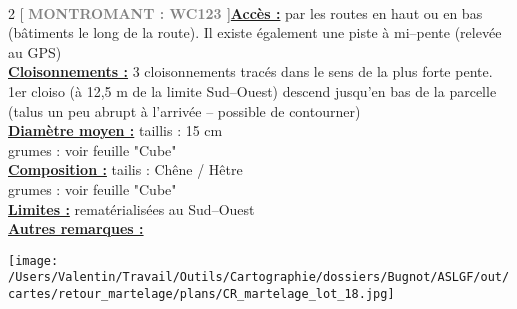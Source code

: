 \documentclass[a4paper,openany]{book}\usepackage[]{graphicx}\usepackage[]{color}
\begin{document}
\\\begin{multicols}{2}
[
\textbf{\textcolor{gray}{
\large MONTROMANT : WC123
}}
]\noindent\textbf{\underline{Accès :}} par les routes en haut ou en bas (bâtiments le long de la route). Il existe également une piste à mi--pente (relevée au GPS)\vspace{0.1cm} \\\noindent\textbf{\underline{Cloisonnements :}} 3 cloisonnements tracés dans le sens de la plus forte pente. 1er cloiso (à 12,5 m de la limite Sud--Ouest) descend jusqu'en bas de la parcelle (talus un peu abrupt à l'arrivée -- possible de contourner)\vspace{0.1cm} \\\noindent\textbf{\underline{Diamètre moyen :}} taillis : 15 cm \\ grumes : voir feuille "Cube"\vspace{0.1cm} \\\noindent\textbf{\underline{Composition :}} tailis : Chêne / Hêtre \\ grumes : voir feuille "Cube"\vspace{0.1cm} \\\noindent\textbf{\underline{Limites :}} rematérialisées au Sud--Ouest\vspace{0.1cm} \\\noindent\textbf{\underline{Autres remarques :}} \vspace{0.1cm} \\\end{multicols}\begin{center}
\texttt{[image: /Users/Valentin/Travail/Outils/Cartographie/dossiers/Bugnot/ASLGF/out/cartes/retour\_martelage/plans/CR\_martelage\_lot\_18.jpg]}
\end{center}\newpage\noindent
\end{document}
